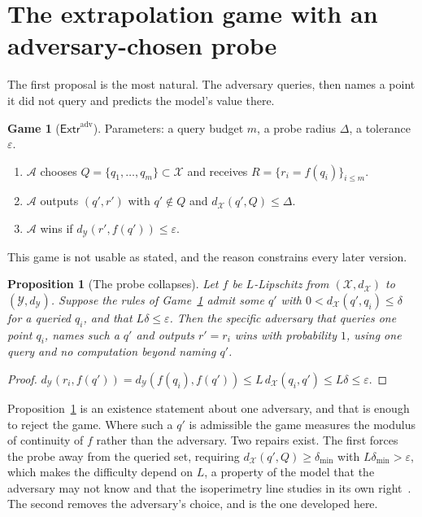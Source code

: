 \documentclass[11pt]{article}
\theoremstyle{definition}
\newtheorem{game}{Game}
\theoremstyle{plain}
\newtheorem{proposition}{Proposition}
\newcommand{\A}{\mathcal{A}}
\newcommand{\X}{\mathcal{X}}
\newcommand{\Y}{\mathcal{Y}}
\begin{document}
\section{The extrapolation game with an adversary-chosen probe}
\label{sec:g1}

The first proposal is the most natural. The adversary queries, then names a point
it did not query and predicts the model's value there.

\begin{game}[$\mathsf{Extr}^{\mathrm{adv}}$]
\label{game:g1}
Parameters: a query budget $m$, a probe radius $\Delta$, a tolerance $\varepsilon$.
\begin{enumerate}
  \item $\A$ chooses $Q = \{q_1,\dots,q_m\} \subset \X$ and receives
        $R = \{r_i = f(q_i)\}_{i \le m}$.
  \item $\A$ outputs $(q', r')$ with $q' \notin Q$ and $d_\X(q', Q) \le \Delta$.
  \item $\A$ wins if $d_\Y(r', f(q')) \le \varepsilon$.
\end{enumerate}
\end{game}

This game is not usable as stated, and the reason constrains every later version.

\begin{proposition}[The probe collapses]
\label{prop:collapse}
Let $f$ be $L$-Lipschitz from $(\X,d_\X)$ to $(\Y,d_\Y)$. Suppose the rules of
Game~\ref{game:g1} admit some $q'$ with $0 < d_\X(q', q_i) \le \delta$ for a
queried $q_i$, and that $L\delta \le \varepsilon$. Then the specific adversary that
queries one point $q_i$, names such a $q'$ and outputs $r' = r_i$ wins with
probability $1$, using one query and no computation beyond naming $q'$.
\end{proposition}

\begin{proof}
$d_\Y(r_i, f(q')) = d_\Y(f(q_i), f(q')) \le L\, d_\X(q_i, q') \le L\delta \le
\varepsilon$.
\end{proof}

Proposition~\ref{prop:collapse} is an existence statement about one adversary, and
that is enough to reject the game. Where such a $q'$ is admissible the game
measures the modulus of continuity of $f$ rather than the adversary. Two repairs
exist. The first forces the probe away from the queried set, requiring
$d_\X(q',Q) \ge \delta_{\min}$ with $L\delta_{\min} > \varepsilon$, which makes the
difficulty depend on $L$, a property of the model that the adversary may not know
and that the isoperimetry line studies in its own right~\cite{BS21}. The second
removes the adversary's choice, and is the one developed here.
\end{document}
